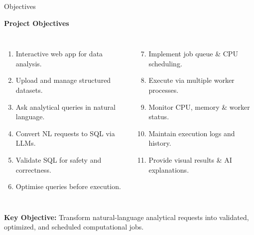 \documentclass[aspectratio=169,11pt]{beamer}
\begin{document}

\begin{frame}{Objectives}

\textbf{\color{GEUBlue}\small Project Objectives}

\vspace{1mm}

\begin{columns}[T,totalwidth=\textwidth]
\begin{enumerate}\itemsep1pt
\scriptsize
\item Interactive web app for data analysis.
\item Upload and manage structured datasets.
\item Ask analytical queries in natural language.
\item Convert NL requests to SQL via LLMs.
\item Validate SQL for safety and correctness.
\item Optimise queries before execution.
\end{enumerate}


\begin{enumerate}\setcounter{enumi}{6}\itemsep1pt
\scriptsize
\item Implement job queue \& CPU scheduling.
\item Execute via multiple worker processes.
\item Monitor CPU, memory \& worker status.
\item Maintain execution logs and history.
\item Provide visual results \& AI explanations.
\end{enumerate}
\end{columns}

\vspace{3mm}

\begin{center}
\colorbox{GEULightBlue}{
\parbox{.90\textwidth}{
\centering\scriptsize
\textbf{Key Objective:} Transform natural-language analytical requests into validated, optimized, and scheduled computational jobs.
}}
\end{center}

\end{frame}


\end{document}
